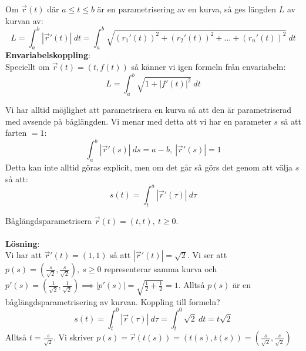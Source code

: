 \documentclass{report}
\begin{document}
{
Om $ \vec{r} (t)  $ där $ a \le t \le b $ är en parametrisering av en kurva, så ges längden $ L $ av kurvan av:
\begin{equation*}
L = \int_{a}^{b} | \vec{r} '(t) | \: dt = \int_{a}^{b} \sqrt{(r_1'(t))^2 + (r_2'(t))^2 + \ldots + (r_n'(t))^2}  \: dt  
\end{equation*}
\textbf{Envariabelskoppling}:\\
Speciellt om $ \vec{r} (t) = (t,f(t)) $ så känner vi igen formeln från envariabeln:
\begin{equation*}
L = \int_{a}^{b} \sqrt{1 + |f'(t)|^2}  \: dt 
\end{equation*}
}

{
Vi har alltid möjlighet att parametrisera en kurva så att den är parametriserad med avsende på båglängden. Vi menar med detta att vi har en parameter $ s $ så att farten $  = 1 $:
\begin{equation*}
\int_{a}^{b} | \vec{r} '(s)| \: ds = a-b, \: | \vec{r} ' (s) | = 1 
\end{equation*}
Detta kan inte alltid göras explicit, men om det går så görs det genom att välja $ s $ så att:
\begin{equation*}
s(t) = \int_{t}^{a} | \vec{r} '(\tau)| \: d\tau 
\end{equation*}
}

\ex{}
{
Båglängdsparametrisera $ \vec{r} (t) = (t,t), \: t \ge 0 $.\\\\

\textbf{Lösning}:\\
Vi har att $ \vec{r} '(t) =(1,1) $ så att $ |\vec{r} '(t)| = \sqrt{2}  $. Vi ser att $ p(s) = ( \frac{s}{ \sqrt{2} } , \frac{s}{ \sqrt{2} } ), \: s \ge 0 $ representerar samma kurva och $ p'(s) = ( \frac{1}{ \sqrt{2} } , \frac{1}{ \sqrt{2} }  ) \implies  |p'(s)| = \sqrt{ \frac{1}{2} + \frac{1}{2} } = 1 $. Alltså $ p(s) $ är en båglängdsparametrisering av kurvan. Koppling till formeln?
\begin{equation*}
	s(t) = \int_{t}^{0} | \vec{r} (\tau)|  \: d\tau = \int_{t}^{0} \sqrt{2}  \: dt = t \sqrt{2}  
\end{equation*}
Alltså $ t = \frac{s}{ \sqrt{2} }  $. Vi skriver $ p(s) = \vec{r} (t(s)) = (t(s), t(s)) = ( \frac{s}{ \sqrt{2} } , \frac{s}{ \sqrt{2} }   ) $ 
}
\end{document}
